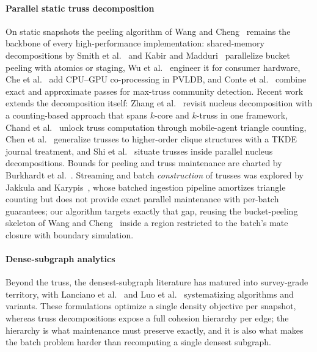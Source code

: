 \paragraph{Parallel static truss decomposition}
On static snapshots the peeling algorithm of Wang and Cheng~\cite{wang2012truss} remains the backbone of every high-performance implementation: shared-memory decompositions by Smith et al.~\cite{smith2017truss} and Kabir and Madduri~\cite{kabir2017sharedmemory} parallelize bucket peeling with atomics or staging, Wu et al.~\cite{wu2018ktruss} engineer it for consumer hardware, Che et al.~\cite{che2020accelerating} add CPU--GPU co-processing in PVLDB, and Conte et al.~\cite{conte2020truly} combine exact and approximate passes for max-truss community detection.
Recent work extends the decomposition itself: Zhang et al.~\cite{zhang2026nucleus} revisit nucleus decomposition with a counting-based approach that spans $k$-core and $k$-truss in one framework, Chand et al.~\cite{chand2024agentbased} unlock truss computation through mobile-agent triangle counting, Chen et al.~\cite{chen2021higherorder} generalize trusses to higher-order clique structures with a TKDE journal treatment, and Shi et al.~\cite{shi2023parallel} situate trusses inside parallel nucleus decompositions.
Bounds for peeling and truss maintenance are charted by Burkhardt et al.~\cite{burkhardt2018bounds}.
Streaming and batch \emph{construction} of trusses was explored by Jakkula and Karypis~\cite{jakkula2019streaming}, whose batched ingestion pipeline amortizes triangle counting but does not provide exact parallel maintenance with per-batch guarantees; our algorithm targets exactly that gap, reusing the bucket-peeling skeleton of Wang and Cheng~\cite{wang2012truss} inside a region restricted to the batch's mate closure with boundary simulation.

\paragraph{Dense-subgraph analytics}
Beyond the truss, the densest-subgraph literature has matured into survey-grade territory, with Lanciano et al.~\cite{lanciano2024survey} and Luo et al.~\cite{luo2023survey} systematizing algorithms and variants.
These formulations optimize a single density objective per snapshot, whereas truss decompositions expose a full cohesion hierarchy per edge; the hierarchy is what maintenance must preserve exactly, and it is also what makes the batch problem harder than recomputing a single densest subgraph.
